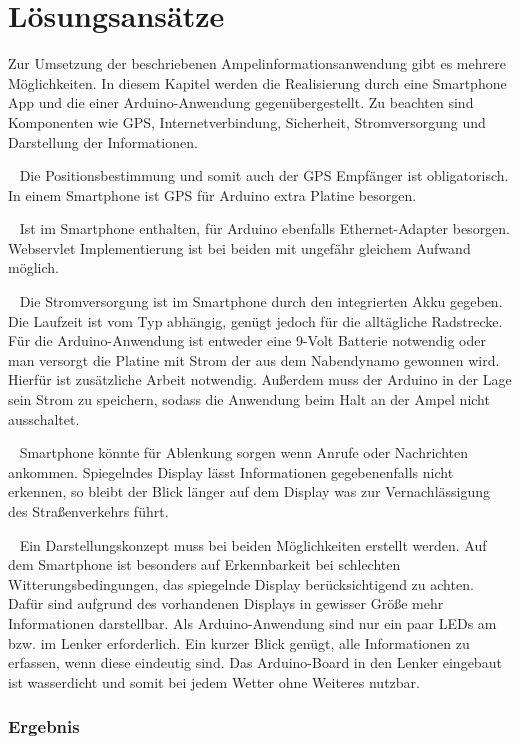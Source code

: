 \chapter{Lösungsansätze}
Zur Umsetzung der beschriebenen Ampelinformationsanwendung gibt es mehrere Möglichkeiten. In diesem Kapitel werden die Realisierung durch eine Smartphone App und die einer \gls{Arduino}-Anwendung gegenübergestellt. Zu beachten sind Komponenten wie \gls{GPS}, Internetverbindung, Sicherheit, Stromversorgung und Darstellung der Informationen.\\
\begin{description}[leftmargin=1cm,style=nextline]
  \item[\gls{GPS}-Empfänger] ~ Die Positionsbestimmung und somit auch der \gls{GPS} Empfänger ist obligatorisch. In einem Smartphone ist GPS für \gls{Arduino} extra Platine besorgen\cite{arduino}.\\
  \item[Internetverbindung] ~ Ist im Smartphone enthalten, für \gls{Arduino} ebenfalls Ethernet-Adapter besorgen. Webservlet Implementierung ist bei beiden mit ungefähr gleichem Aufwand möglich.\\
  \item[Stromversorgung] ~ Die Stromversorgung ist im Smartphone durch den integrierten Akku gegeben. Die Laufzeit ist vom Typ abhängig, genügt jedoch für die alltägliche Radstrecke. Für die \gls{Arduino}-Anwendung ist entweder eine 9-Volt Batterie notwendig oder man versorgt die Platine mit Strom der aus dem Nabendynamo gewonnen wird. Hierfür ist zusätzliche Arbeit notwendig. Außerdem muss der \gls{Arduino} in der Lage sein Strom zu speichern, sodass die Anwendung beim Halt an der Ampel nicht ausschaltet.\\
  \item[Verkehrssicherheit] ~ Smartphone könnte für Ablenkung sorgen wenn Anrufe oder Nachrichten ankommen. Spiegelndes Display lässt Informationen gegebenenfalls nicht erkennen, so bleibt der Blick länger auf dem Display was zur Vernachlässigung des Straßenverkehrs führt.\\ 
  \item[Darstellung] ~ Ein Darstellungskonzept muss bei beiden Möglichkeiten erstellt werden. Auf dem Smartphone ist besonders auf Erkennbarkeit bei schlechten Witterungsbedingungen, das spiegelnde Display berücksichtigend zu achten. Dafür sind aufgrund des vorhandenen Displays in gewisser Größe mehr Informationen darstellbar. Als \gls{Arduino}-Anwendung sind nur ein paar \glspl{LED} am bzw. im Lenker erforderlich. Ein kurzer Blick genügt, alle Informationen zu erfassen, wenn diese eindeutig sind. Das \gls{Arduino}-Board in den Lenker eingebaut ist wasserdicht und somit bei jedem Wetter ohne Weiteres nutzbar.\\
\end{description}

\subsection*{Ergebnis}  
